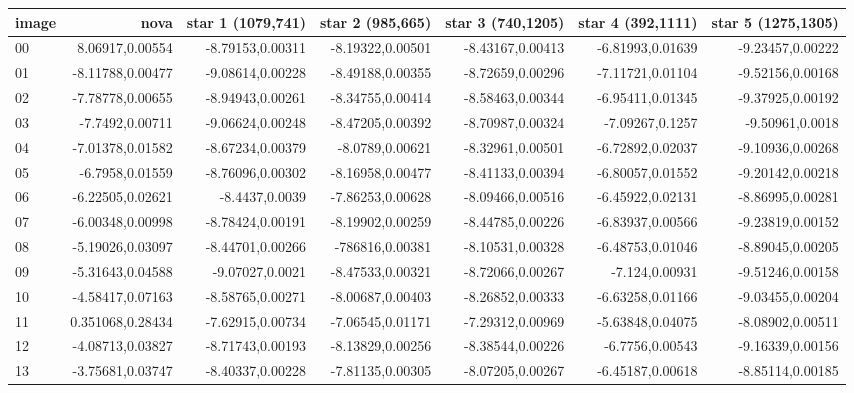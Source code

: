 \documentclass{article}
\begin{document}
\begin{enumerate}
		\begin{table}
			\centering
			\begin{tabular} {l r r r r r r}
				\toprule
				\textbf{image} & \textbf{nova} & \textbf{star 1 (1079,741)} & \textbf{star 2 (985,665)} & \textbf{star 3 (740,1205)} & \textbf{star 4 (392,1111)} & \textbf{star 5 (1275,1305)} \\
				\midrule
				00 & 8.06917,0.00554 & -8.79153,0.00311 & -8.19322,0.00501 & -8.43167,0.00413 & -6.81993,0.01639 & -9.23457,0.00222 \\
				01 & -8.11788,0.00477 & -9.08614,0.00228 & -8.49188,0.00355 & -8.72659,0.00296 & -7.11721,0.01104 & -9.52156,0.00168 \\
				02 & -7.78778,0.00655 & -8.94943,0.00261 & -8.34755,0.00414 & -8.58463,0.00344 & -6.95411,0.01345 & -9.37925,0.00192 \\
				03 & -7.7492,0.00711 & -9.06624,0.00248 & -8.47205,0.00392 & -8.70987,0.00324 & -7.09267,0.1257 & -9.50961,0.0018 \\
				04 & -7.01378,0.01582 & -8.67234,0.00379 & -8.0789,0.00621 & -8.32961,0.00501 & -6.72892,0.02037 & -9.10936,0.00268 \\
				05 & -6.7958,0.01559 & -8.76096,0.00302 & -8.16958,0.00477 & -8.41133,0.00394 & -6.80057,0.01552 & -9.20142,0.00218 \\
				06 & -6.22505,0.02621 & -8.4437,0.0039 & -7.86253,0.00628 & -8.09466,0.00516 & -6.45922,0.02131 & -8.86995,0.00281 \\
				07 & -6.00348,0.00998 & -8.78424,0.00191 & -8.19902,0.00259 & -8.44785,0.00226 & -6.83937,0.00566 & -9.23819,0.00152 \\
				08 & -5.19026,0.03097 & -8.44701,0.00266 & -786816,0.00381 & -8.10531,0.00328 & -6.48753,0.01046 & -8.89045,0.00205 \\
				09 & -5.31643,0.04588 & -9.07027,0.0021 & -8.47533,0.00321 & -8.72066,0.00267 & -7.124,0.00931 & -9.51246,0.00158 \\
				10 & -4.58417,0.07163 & -8.58765,0.00271 & -8.00687,0.00403 & -8.26852,0.00333 & -6.63258,0.01166 & -9.03455,0.00204 \\
				11 & 0.351068,0.28434 & -7.62915,0.00734 & -7.06545,0.01171 & -7.29312,0.00969 & -5.63848,0.04075 & -8.08902,0.00511 \\
				12 & -4.08713,0.03827 & -8.71743,0.00193 & -8.13829,0.00256 & -8.38544,0.00226 & -6.7756,0.00543 & -9.16339,0.00156 \\
				13 & -3.75681,0.03747 & -8.40337,0.00228 & -7.81135,0.00305 & -8.07205,0.00267 & -6.45187,0.00618 & -8.85114,0.00185 \\

\end{tabular}
\end{table}
\end{enumerate}
\end{document}
